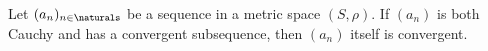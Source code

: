 \documentclass[article, a4paper, 11pt, oneside]{memoir}
\numberwithin{equation}{chapter}
\begin{document}




\begin{lemma}
    Let $(a_n)_{n\in\naturals}$ be a sequence in a metric space $(S,\rho)$. If $(a_n)$ is both Cauchy and has a convergent subsequence, then $(a_n)$ itself is convergent.
\end{lemma}
\end{document}
